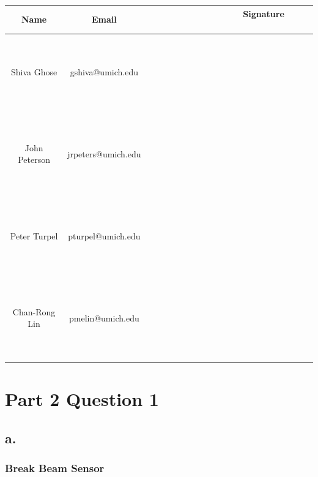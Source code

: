 \documentclass{article}
\theoremstyle{plain}
\theoremstyle{definition}
\theoremstyle{remark}
\begin{document}
\begin{table}[h]
\begin{center}
    \begin{tabular}{|c|c|c|}
        \hline
        \textbf{Name} & \textbf{Email}     & \textbf{ \ \ \ \ \  \ \  \ \ \ \ \  \ \ Signature  \ \ \ \ \  \ \ \ \ \ \ \  \ \ } \\ \hline
        	~& ~& ~\\
	~& ~& ~\\
	Shiva Ghose   & gshiva@umich.edu   & ~                  \\
	~& ~& ~\\
	~& ~& ~\\ \hline 
	~& ~& ~\\
	~& ~& ~\\
        John Peterson & jrpeters@umich.edu & ~                  \\ 
	~& ~& ~\\
	~& ~& ~\\ \hline 
	~& ~& ~\\
	~& ~& ~\\
        Peter Turpel   & pturpel@umich.edu & ~                  \\
	~& ~& ~\\
	~& ~& ~\\ \hline 
	~& ~& ~\\
	~& ~& ~\\
        Chan-Rong Lin   & pmelin@umich.edu & ~                  \\
	~& ~& ~\\
	~& ~& ~\\ \hline 
        \hline
    \end{tabular}
\end{center}
\end{table}

\newpage

\section{Part 2 Question 1}

\subsection*{a.}

\subsubsection{Break Beam Sensor}
\end{document}
